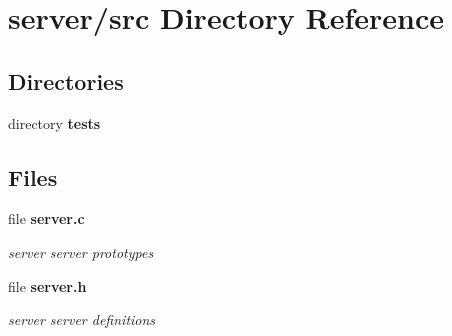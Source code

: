 \section{server/src Directory Reference}
\label{dir_a063914ab482288b7b0e1b2fca86158c}
\subsection*{Directories}
\begin{DoxyCompactItemize}
\item 
directory {\bf tests}
\end{DoxyCompactItemize}
\subsection*{Files}
\begin{DoxyCompactItemize}
\item 
file {\bf server.\-c}
\begin{DoxyCompactList}\small\item\em server server prototypes \end{DoxyCompactList}\item 
file {\bf server.\-h}
\begin{DoxyCompactList}\small\item\em server server definitions \end{DoxyCompactList}\end{DoxyCompactItemize}
